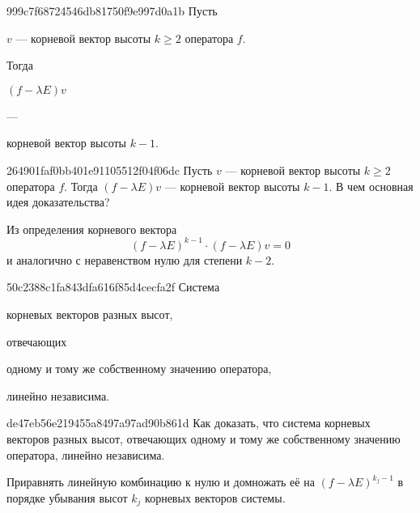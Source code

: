 \begin{note}{999c7f68724546db81750f9e997d0a1b}
    Пусть \begin{icloze}{3}\( v \) --- корневой вектор высоты \( k \geqslant 2 \) оператора \( f \).\end{icloze}
    Тогда \begin{icloze}{2}\( (f - \lambda E) v \)\end{icloze} --- \begin{icloze}{1}корневой вектор высоты \( k - 1 \).\end{icloze}
\end{note}

\begin{note}{264901faf0bb401e91105512f04f06dc}
    Пусть \( v \) --- корневой вектор высоты \( k \geqslant 2 \) оператора \( f \).
    Тогда \( (f - \lambda E) v \) --- корневой вектор высоты \( k - 1 \).
    В чем основная идея доказательства?

    \begin{cloze}{1}
        Из определения корневого вектора
        \[
            (f - \lambda E)^{k - 1} \cdot (f - \lambda E)v = 0
        \]
        и аналогично с неравенством нулю для степени \( k - 2 \).
    \end{cloze}
\end{note}

\begin{note}{50c2388c1fa843dfa616f85d4cecfa2f}
    Система \begin{icloze}{3}корневых векторов разных высот,\end{icloze} отвечающих \begin{icloze}{2}одному и тому же собственному значению оператора,\end{icloze} \begin{icloze}{1}линейно независима.\end{icloze}
\end{note}

\begin{note}{de47eb56e219455a8497a97ad90b861d}
    Как доказать, что система корневых векторов разных высот, отвечающих одному и тому же собственному значению оператора, линейно независима.

    \begin{cloze}{1}
        Приравнять линейную комбинацию к нулю и домножать её на \( (f - \lambda E)^{k_j - 1} \) в порядке убывания высот \( k_j \) корневых векторов системы.
    \end{cloze}
\end{note}

